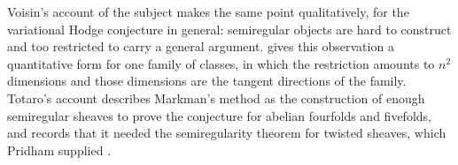 \begin{remark}
Voisin's account of the subject \cite{Voi26} makes the same point
qualitatively, for the variational Hodge conjecture in general: semiregular
objects are hard to construct and too restricted to carry a general argument.
 gives this observation a quantitative form for one
family of classes, in which the restriction amounts to $n^{2}$ dimensions and
those dimensions are the tangent directions of the family. Totaro's account
\cite{Tot26} describes Markman's method as the construction of enough
semiregular sheaves to prove the conjecture for abelian fourfolds and
fivefolds, and records that it needed the semiregularity theorem for twisted
sheaves, which Pridham supplied \cite{Pri24}.
\end{remark}

